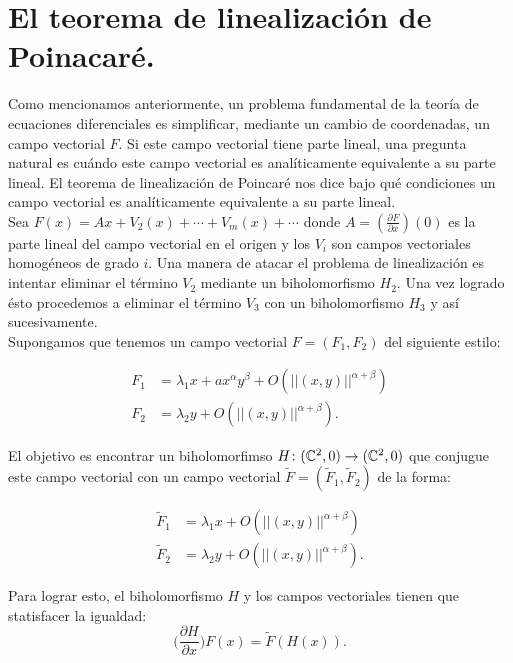 \section{El teorema de linealización de Poinacaré.}
\label{sec:LinenalizacionDePoincare}
Como mencionamos anteriormente, un problema fundamental de la teoría de ecuaciones diferenciales es simplificar, mediante un cambio de coordenadas, un campo vectorial $F$. Si este campo vectorial tiene parte lineal, una pregunta natural es cuándo este campo vectorial es analíticamente equivalente a su parte lineal. El teorema de linealización de Poincaré nos dice bajo qué condiciones un campo vectorial es analíticamente equivalente a su parte lineal.\\

Sea $F(x)=Ax+V_{2}(x)+\cdots+V_{m}(x)+\cdots$ donde $A=(\tfrac{\partial F}{\partial x})(0)$ es la parte lineal del campo vectorial en el origen y los $V_{i}$ son campos vectoriales homogéneos de grado $i$. Una manera de atacar el problema de linealización es intentar eliminar el término $V_{2}$ mediante un biholomorfismo $H_{2}$. Una vez logrado ésto procedemos a eliminar el término $V_{3}$ con un biholomorfismo $H_{3}$ y así sucesivamente.\\

Supongamos que tenemos un campo vectorial  $F=(F_{1},F_{2})$ del siguiente estilo:

\begin{equation}
\label{CampoVectInicial}
\begin{aligned}
F_{1} &= \lambda_{1}x +ax^{\alpha}y^{\beta}+O(||(x,y)||^{\alpha+\beta})\\
F_{2} &= \lambda_{2}y + O(||(x,y)||^{\alpha+\beta}).
\end{aligned}
\end{equation}

\noindent El objetivo es encontrar un biholomorfimso $H\colon (\mathbb{C}^{2},0)\rightarrow(\mathbb{C}^{2},0)$ que conjugue este campo vectorial con un campo vectorial $\tilde{F}=(\tilde{F}_{1},\tilde{F}_{2})$ de la forma:

\begin{equation}
\label{CampoVectFinal}
\begin{aligned}
\tilde{F}_{1} &= \lambda_{1}x +O(||(x,y)||^{\alpha+\beta})\\
\tilde{F}_{2} &= \lambda_{2}y + O(||(x,y)||^{\alpha+\beta}).
\end{aligned}
\end{equation}

\noindent Para lograr esto, el biholomorfismo $H$ y los campos vectoriales tienen que statisfacer la igualdad:
\begin{equation}
\label{NuevaEquivalenciaAnalitica}
\Big(\frac{\partial H}{\partial x}\Big)F(x)=\tilde{F}(H(x)).
\end{equation}


